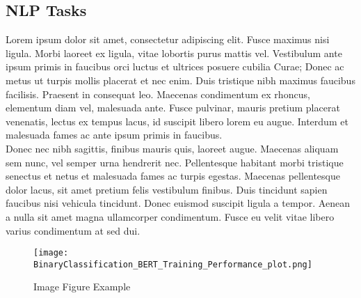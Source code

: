 \subsection{NLP Tasks}
\label{sec:Abstract_Introduction_NLP_Tasks}

Lorem ipsum dolor sit amet, consectetur adipiscing elit. Fusce maximus nisi ligula. Morbi laoreet ex ligula, vitae lobortis purus mattis vel. Vestibulum ante ipsum primis in faucibus orci luctus et ultrices posuere cubilia Curae; Donec ac metus ut turpis mollis placerat et nec enim. Duis tristique nibh maximus faucibus facilisis. Praesent in consequat leo. Maecenas condimentum ex rhoncus, elementum diam vel, malesuada ante. Fusce pulvinar, mauris pretium placerat venenatis, lectus ex tempus lacus, id suscipit libero lorem eu augue. Interdum et malesuada fames ac ante ipsum primis in faucibus. \\

Donec nec nibh sagittis, finibus mauris quis, laoreet augue. Maecenas aliquam sem nunc, vel semper urna hendrerit nec. Pellentesque habitant morbi tristique senectus et netus et malesuada fames ac turpis egestas. Maecenas pellentesque dolor lacus, sit amet pretium felis vestibulum finibus. Duis tincidunt sapien faucibus nisi vehicula tincidunt. Donec euismod suscipit ligula a tempor. Aenean a nulla sit amet magna ullamcorper condimentum. Fusce eu velit vitae libero varius condimentum at sed dui. \\

\begin{figure}[!ht]
	\centering
	\texttt{[image: BinaryClassification\_BERT\_Training\_Performance\_plot.png]}
	\caption{Image Figure Example}
	\label{fig:Abstract_ImageFigureExample}
\end{figure}

\endgroup